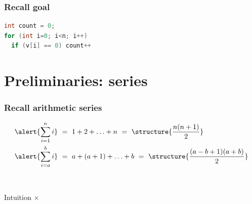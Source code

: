 \documentclass[aspectratio=169]{beamer}
\begin{document}
\begin{frame}[fragile]\frametitle{Recall goal}

\begin{lstlisting}[language=C++,linewidth=50mm]
int count = 0;
for (int i=0; i<n; i++)
  if (v[i] == 0) count++
\end{lstlisting}    

\end{frame}


\section{Preliminaries: series}


\begin{frame}\frametitle{Recall arithmetic series}
    
\begin{align*}
  \alert{\sum_{i=1}^n i} &~=~ 1 + 2 + \ldots + n ~=~ \structure{\frac{n(n+1)}{2}}
  \\
  \alert{\sum_{i=a}^b i} &~=~ a + (a+1) + \ldots + b ~=~
    \structure{\frac{(a-b+1)(a+b)}{2}}
\end{align*}

~\\[8mm]

\begin{block}{Intuition}
\centering
{} $\times$   
\end{block}
\end{frame}
\end{document}

